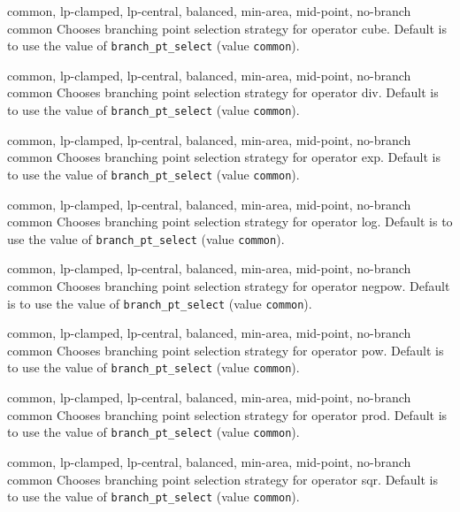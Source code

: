 %
{\ttfamily common, lp-clamped, lp-central, balanced, min-area, mid-point, no-branch}%
{common}%
{Chooses branching point selection strategy for operator cube.
Default is to use the value of \texttt{branch\_pt\_select} (value \texttt{common}).}%
{}

%
{\ttfamily common, lp-clamped, lp-central, balanced, min-area, mid-point, no-branch}%
{common}%
{Chooses branching point selection strategy for operator div.
Default is to use the value of \texttt{branch\_pt\_select} (value \texttt{common}).}%
{}

%
{\ttfamily common, lp-clamped, lp-central, balanced, min-area, mid-point, no-branch}%
{common}%
{Chooses branching point selection strategy for operator exp.
Default is to use the value of \texttt{branch\_pt\_select} (value \texttt{common}).}%
{}

%
{\ttfamily common, lp-clamped, lp-central, balanced, min-area, mid-point, no-branch}%
{common}%
{Chooses branching point selection strategy for operator log.
Default is to use the value of \texttt{branch\_pt\_select} (value \texttt{common}).}%
{}

%
{\ttfamily common, lp-clamped, lp-central, balanced, min-area, mid-point, no-branch}%
{common}%
{Chooses branching point selection strategy for operator negpow.
Default is to use the value of \texttt{branch\_pt\_select} (value \texttt{common}).}%
{}

%
{\ttfamily common, lp-clamped, lp-central, balanced, min-area, mid-point, no-branch}%
{common}%
{Chooses branching point selection strategy for operator pow.
Default is to use the value of \texttt{branch\_pt\_select} (value \texttt{common}).}%
{}

%
{\ttfamily common, lp-clamped, lp-central, balanced, min-area, mid-point, no-branch}%
{common}%
{Chooses branching point selection strategy for operator prod.
Default is to use the value of \texttt{branch\_pt\_select} (value \texttt{common}).}%
{}

%
{\ttfamily common, lp-clamped, lp-central, balanced, min-area, mid-point, no-branch}%
{common}%
{Chooses branching point selection strategy for operator sqr.
Default is to use the value of \texttt{branch\_pt\_select} (value \texttt{common}).}%
{}

